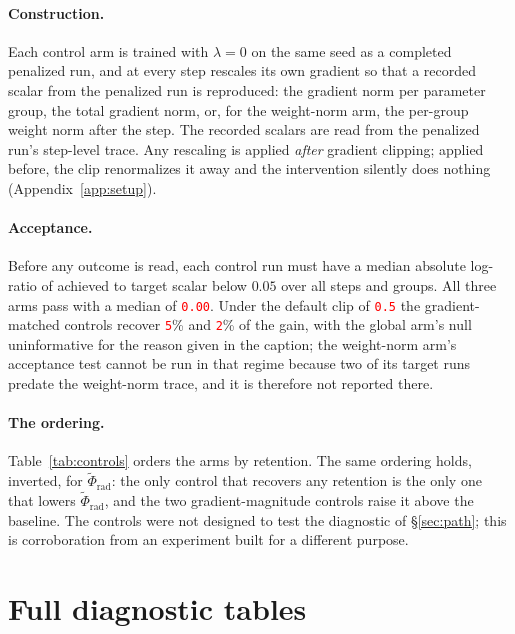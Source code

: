 \documentclass[anon]{opt2026}     %
\newcommand{\PH}[1]{\textcolor{red}{\texttt{#1}}}   %
\newcommand{\phirad}{\tilde{\Phi}_{\mathrm{rad}}}
\begin{document}
\paragraph{Construction.} Each control arm is trained with $\lambda = 0$ on the
same seed as a completed penalized run, and at every step rescales its own
gradient so that a recorded scalar from the penalized run is reproduced: the
gradient norm per parameter group, the total gradient norm, or, for the
weight-norm arm, the per-group weight norm after the step. The recorded scalars
are read from the penalized run's step-level trace. Any rescaling is applied
\emph{after} gradient clipping; applied before, the clip renormalizes it away and
the intervention silently does nothing (Appendix~\ref{app:setup}).

\paragraph{Acceptance.} Before any outcome is read, each control run must have
a median absolute log-ratio of achieved to target scalar below $0.05$ over all
steps and groups. All three arms pass with a median of \PH{0.00}. Under the default clip
of \PH{0.5} the gradient-matched controls recover \PH{5}\% and \PH{2}\% of the
gain, with the global arm's null uninformative for the reason given in the
caption; the weight-norm arm's acceptance test cannot be run in that regime
because two of its target runs predate the weight-norm trace, and it is
therefore not reported there.

\paragraph{The ordering.} Table~\ref{tab:controls} orders the arms by
retention. The same ordering holds, inverted, for $\phirad$: the only control
that recovers any retention is the only one that lowers $\phirad$, and the two
gradient-magnitude controls raise it above the baseline. The controls were not
designed to test the diagnostic of \S\ref{sec:path}; this is corroboration from
an experiment built for a different purpose.

\section{Full diagnostic tables}
\label{app:battery}
\end{document}
